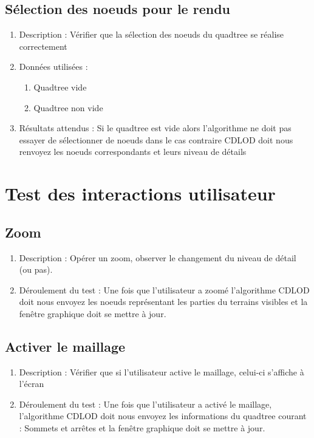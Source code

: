 \documentclass[12pt]{report}
\begin{document}
\subsection{Sélection des noeuds pour le rendu}
\begin{enumerate}
    \item Description : Vérifier que la sélection des noeuds du quadtree se réalise correctement 
    \item Données utilisées :
    \begin{enumerate}
        \item Quadtree vide
        \item Quadtree non vide
    \end{enumerate}
    \item Résultats attendus : Si le quadtree est vide alors l'algorithme ne doit pas essayer de sélectionner de noeuds dans le cas contraire CDLOD doit nous renvoyez les noeuds correspondants et leurs niveau de détails
\end{enumerate}

\section{Test des interactions utilisateur}
\subsection{Zoom}
\begin{enumerate}
    \item Description : Opérer un zoom, observer le changement du niveau de détail (ou pas).
    \item Déroulement du test : Une fois que l'utilisateur a zoomé l'algorithme CDLOD doit nous envoyez les noeuds représentant les parties du terrains visibles et la fenêtre graphique doit se mettre à jour.
\end{enumerate}

\subsection{Activer le maillage}
\begin{enumerate}
    \item Description : Vérifier que si l'utilisateur active le maillage, celui-ci s'affiche à l'écran
    \item Déroulement du test : Une fois que l'utilisateur a activé le maillage, l'algorithme CDLOD doit nous envoyez les informations du quadtree courant : Sommets et arrêtes et la fenêtre graphique doit se mettre à jour.
\end{enumerate}
\end{document}

